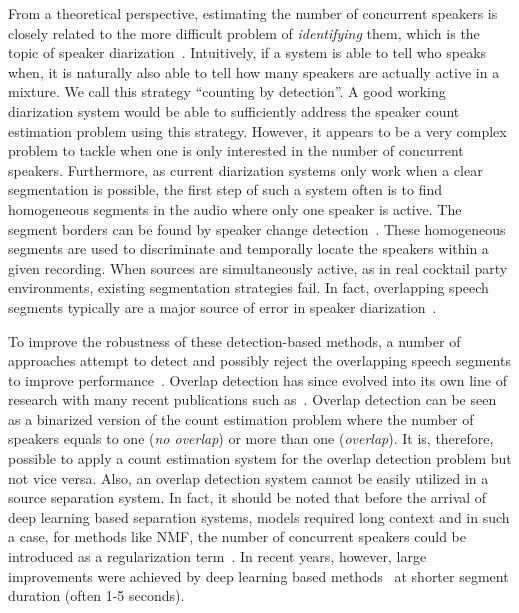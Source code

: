 From a theoretical perspective, estimating the number of concurrent speakers is closely related to the more difficult problem of \textit{identifying} them, which is the topic of speaker diarization~\cite{angueramiro12, rouvier13, rouvier15, ramaiah17}.
Intuitively, if a system is able to tell who speaks when, it is naturally also able to tell how many speakers are actually active in a mixture.
We call this strategy ``counting by detection''.
A good working diarization system would be able to sufficiently address the speaker count estimation problem using this strategy.
However, it appears to be a very complex problem to tackle when one is only interested in the number of concurrent speakers.
Furthermore, as current diarization systems only work when a clear segmentation is possible, the first step of such a system often is to find homogeneous segments in the audio where only one speaker is active.
The segment borders can be found by speaker change detection~\cite{Yin17}.
These homogeneous segments are used to discriminate and temporally locate the speakers within a given recording.
When sources are simultaneously active, as in real cocktail party environments, existing segmentation strategies fail.
In fact, overlapping speech segments typically are a major source of error in speaker diarization~\cite{angueramiro12}.
\par
To improve the robustness of these detection-based methods, a number of approaches attempt to detect and possibly reject the overlapping speech segments to improve performance~\cite{boakye08, huijbregts09}.
Overlap detection has since evolved into its own line of research with many recent publications such as~\cite{geiger13, shokouhi17,andrei17}.
Overlap detection can be seen as a binarized version of the count estimation problem where the number of speakers equals to one (\emph{no overlap}) or more than one (\emph{overlap}).
It is, therefore, possible to apply a count estimation system for the overlap detection problem but not vice versa.
Also, an overlap detection system cannot be easily utilized in a source separation system.
In fact, it should be noted that before the arrival of deep learning based separation systems, models required long context and in such a case, for methods like NMF, the number of concurrent speakers could be introduced as a regularization term~\cite{lefevre11}.
In recent years, however, large improvements were achieved by deep learning based methods~\cite{yu16, hershey16} at shorter segment duration (often 1-5 seconds).
